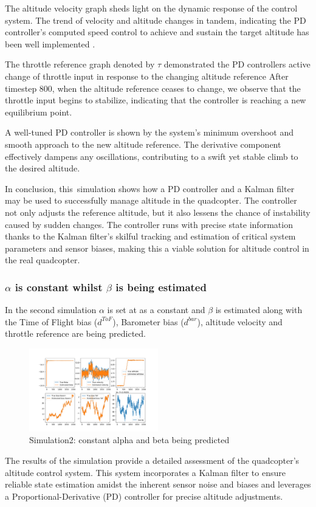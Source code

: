 \documentclass{article}
\begin{document}
The altitude velocity graph sheds light on the dynamic response of the control system. The trend of velocity and altitude changes in tandem, indicating the PD controller's computed speed control to achieve and sustain the target altitude has been well implemented .

The throttle reference graph denoted by \(\tau\) demonstrated the PD controllers active change of throttle input in response to the changing altitude reference After timestep 800, when the altitude reference ceases to change, we observe that the throttle input begins to stabilize, indicating that the controller is reaching a new equilibrium point.

A well-tuned PD controller is shown by the system's minimum overshoot and smooth approach to the new altitude reference. The derivative component effectively dampens any oscillations, contributing to a swift yet stable climb to the desired altitude.

In conclusion, this simulation shows how a PD controller and a Kalman filter may be used to successfully manage altitude in the quadcopter. The controller not only adjusts the reference altitude, but it also lessens the chance of instability caused by sudden changes. The controller runs with precise state information thanks to the Kalman 
filter's skilful tracking and estimation of critical system parameters and sensor biases, making this a viable solution for altitude control in the real quadcopter. 

\subsubsection*{\(\alpha\) is constant whilst \(\beta\) is being estimated}
In the second simulation \(\alpha\) is set at as a constant and \(\beta\) is estimated along with the Time of Flight bias (\(d^{ToF}\)), Barometer bias (\(d^{bar}\)), altitude velocity and throttle reference are being predicted.
\begin{figure}[H]
  \centering
  \includegraphics[width=0.5\textwidth]{Pictures/a_constant_PD.png}
  \caption{Simulation2: constant alpha and beta being predicted}
  \label{fig:a_constant_PD}
\end{figure}
The results of the simulation provide a detailed assessment of the quadcopter's altitude control system. This system incorporates a Kalman filter to ensure reliable state estimation amidst the inherent sensor noise and biases and leverages a Proportional-Derivative (PD) controller for precise altitude adjustments.
\end{document}
